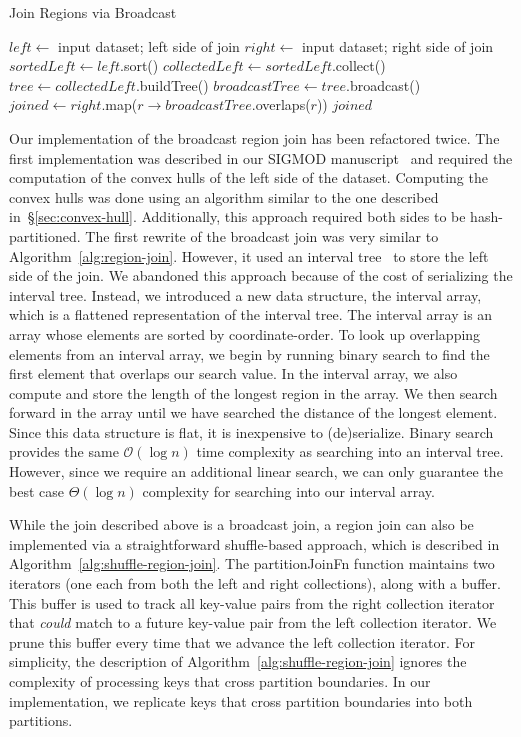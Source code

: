 \documentclass[phd]{ucbthesis}
\begin{document}
\begin{algorithm}
\caption{Join Regions via Broadcast}
\label{alg:region-join}
\begin{algorithmic}
\STATE $left \leftarrow$ input dataset; left side of join
\STATE $right \leftarrow$ input dataset; right side of join
\STATE $sortedLeft \leftarrow left$.sort()
\STATE $collectedLeft \leftarrow sortedLeft$.collect()
\STATE $tree \leftarrow collectedLeft$.buildTree()
\STATE $broadcastTree \leftarrow tree$.broadcast()
\STATE $joined \leftarrow right$.map($r \rightarrow broadcastTree$.overlaps($r$))
\RETURN $joined$
\end{algorithmic}
\end{algorithm}

Our implementation of the broadcast region join has been refactored twice. The
first implementation was described in our SIGMOD manuscript~\cite{nothaft15} and
required the computation of the convex hulls of the left side of the dataset.
Computing the convex hulls was done using an algorithm similar to the one described
in~\S\ref{sec:convex-hull}. Additionally, this approach required both sides to
be hash-partitioned. The first rewrite of the broadcast join was very similar to
Algorithm~\ref{alg:region-join}. However, it used an interval
tree~\cite{samet90} to store the left side of the join. We abandoned this
approach because of the cost of serializing the interval tree. Instead, we
introduced a new data structure, the interval array, which is a flattened
representation of the interval tree. The interval array is an array whose
elements are sorted by coordinate-order. To look up overlapping elements from an
interval array, we begin by running binary search to find the first element that
overlaps our search value. In the interval array, we also compute and store the
length of the longest region in the array. We then search forward in the array
until we have searched the distance of the longest element. Since this data
structure is flat, it is inexpensive to (de)serialize. Binary search provides
the same $\mathcal{O}(\log n)$ time complexity as searching into an interval
tree. However, since we require an additional linear search, we can only
guarantee the best case $\Theta(\log n)$ complexity for searching into our
interval array.

While the join described above is a broadcast join, a region join can also be
implemented via a straightforward shuffle-based approach, which is described in
Algorithm~\ref{alg:shuffle-region-join}. The {partitionJoinFn} function
maintains two iterators (one each from both the left and right collections),
along with a buffer. This buffer is used to track all key-value pairs from the
right collection iterator that \emph{could} match to a future key-value pair
from the left collection iterator. We prune this buffer every time that we
advance the left collection iterator. For simplicity, the description of
Algorithm~\ref{alg:shuffle-region-join} ignores the complexity of processing
keys that cross partition boundaries. In our implementation, we replicate keys
that cross partition boundaries into both partitions.
\end{document}
